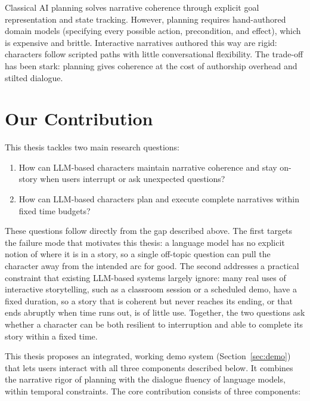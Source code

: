 Classical AI planning solves narrative coherence through explicit goal representation and state tracking. However, planning requires hand-authored domain models (specifying every possible action, precondition, and effect), which is expensive and brittle. Interactive narratives authored this way are rigid: characters follow scripted paths with little conversational flexibility. The trade-off has been stark: planning gives coherence at the cost of authorship overhead and stilted dialogue.

\section*{Our Contribution}

This thesis tackles two main research questions: 

\begin{enumerate}
    \item How can LLM-based characters maintain narrative coherence and stay on-story when users interrupt or ask unexpected questions?

    \item How can LLM-based characters plan and execute complete narratives within fixed time budgets?

\end{enumerate}

These questions follow directly from the gap described above. The first targets the failure mode that motivates this thesis: a language model has no explicit notion of where it is in a story, so a single off-topic question can pull the character away from the intended arc for good. The second addresses a practical constraint that existing LLM-based systems largely ignore: many real uses of interactive storytelling, such as a classroom session or a scheduled demo, have a fixed duration, so a story that is coherent but never reaches its ending, or that ends abruptly when time runs out, is of little use. Together, the two questions ask whether a character can be both resilient to interruption and able to complete its story within a fixed time.

This thesis proposes an integrated, working demo system (Section~\ref{sec:demo}) that lets users interact with all three components described below. It combines the narrative rigor of planning with the dialogue fluency of language models, within temporal constraints. The core contribution consists of three components:




